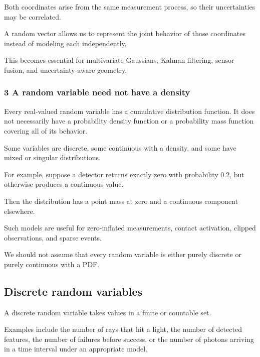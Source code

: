 Both coordinates arise from the same measurement process, so their uncertainties may be correlated.

A random vector allows us to represent the joint behavior of those coordinates instead of modeling each independently.

This becomes essential for multivariate Gaussians, Kalman filtering, sensor fusion, and uncertainty-aware geometry.

\subsubsection{3 A random variable need not have a density}\label{02-foundations-ii-ch023-a-random-variable-need-not-have-a-density}

\hypertarget{02-foundations-ii-ch023-a-random-variable-need-not-have-a-density}{}

Every real-valued random variable has a cumulative distribution function. It does not necessarily have a probability density function or a probability mass function covering all of its behavior.

Some variables are discrete, some continuous with a density, and some have mixed or singular distributions.

For example, suppose a detector returns exactly zero with probability \(0.2\), but otherwise produces a continuous value.

Then the distribution has a point mass at zero and a continuous component elsewhere.

Such models are useful for zero-inflated measurements, contact activation, clipped observations, and sparse events.

We should not assume that every random variable is either purely discrete or purely continuous with a PDF.

\subsection{Discrete random variables}\label{02-foundations-ii-ch023-discrete-random-variables}

\hypertarget{02-foundations-ii-ch023-discrete-random-variables}{}

A discrete random variable takes values in a finite or countable set.

Examples include the number of rays that hit a light, the number of detected features, the number of failures before success, or the number of photons arriving in a time interval under an appropriate model.


